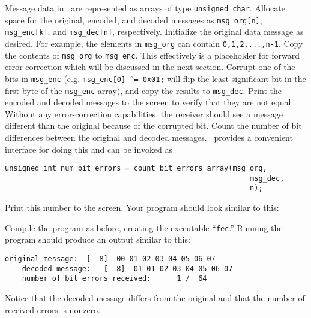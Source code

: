 Message data in \liquid\ are represented as arrays of type
{\tt unsigned char}.
Allocate space for the original, encoded, and decoded messages as
{\tt msg\_org[n]},
{\tt msg\_enc[k]}, and
{\tt msg\_dec[n]}, respectively.
Initialize the original data message as desired.
For example, the elements in {\tt msg\_org} can contain
{\tt 0,1,2,...,n-1}.
Copy the contents of {\tt msg\_org} to {\tt msg\_enc}.
This effectively is a placeholder for forward error-correction which
will be discussed in the next section. %
Corrupt one of the bits in {\tt msg\_enc}
(e.g. {\tt msg\_enc[0] \verb|^|= 0x01;} will flip the least-significant bit in
the first byte of the {\tt msg\_enc} array),
and copy the results to {\tt msg\_dec}.
Print the encoded and decoded messages to the screen to verify that they
are not equal.
Without any error-correction capabilities, the receiver should see a
message different than the original because of the corrupted bit.
Count the number of bit differences between the original and decoded
messages.
\liquid\ provides a convenient interface for doing this and can be
invoked as
%
\begin{Verbatim}[fontsize=\small]
    unsigned int num_bit_errors = count_bit_errors_array(msg_org,
                                                         msg_dec,
                                                         n);
\end{Verbatim}
%
Print this number to the screen.
Your program should look similar to this:
%

%
Compile the program as before, creating the executable ``{\tt fec}.''
Running the program should produce an output similar to this:
%
\begin{Verbatim}[fontsize=\small]
    original message:  [  8]  00 01 02 03 04 05 06 07
    decoded message:   [  8]  01 01 02 03 04 05 06 07
    number of bit errors received:      1 /  64
\end{Verbatim}
%
Notice that the decoded message differs from the original and that the
number of received errors is nonzero.


%
%
